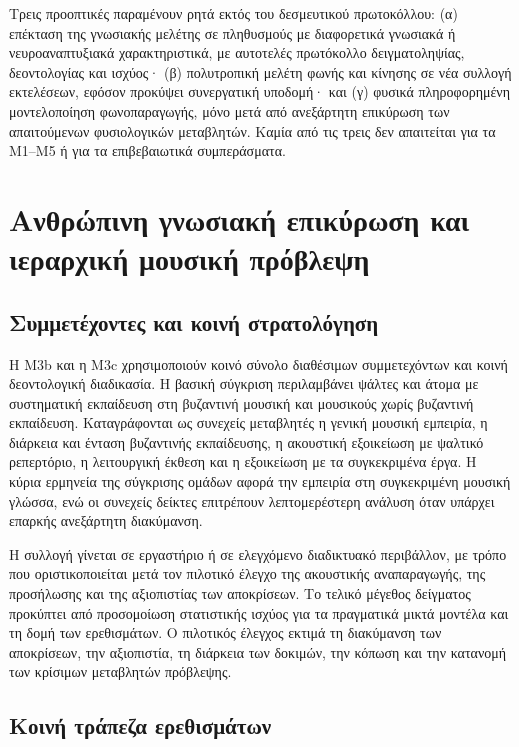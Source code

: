 \documentclass[11pt,a4paper]{article}
\begin{document}
Τρεις προοπτικές παραμένουν ρητά εκτός του δεσμευτικού πρωτοκόλλου: (α) επέκταση της γνωσιακής μελέτης σε πληθυσμούς με διαφορετικά γνωσιακά ή νευροαναπτυξιακά χαρακτηριστικά, με αυτοτελές πρωτόκολλο δειγματοληψίας, δεοντολογίας και ισχύος· (β) πολυτροπική μελέτη φωνής και κίνησης σε νέα συλλογή εκτελέσεων, εφόσον προκύψει συνεργατική υποδομή· και (γ) φυσικά πληροφορημένη μοντελοποίηση φωνοπαραγωγής, μόνο μετά από ανεξάρτητη επικύρωση των απαιτούμενων φυσιολογικών μεταβλητών. Καμία από τις τρεις δεν απαιτείται για τα M1--M5 ή για τα επιβεβαιωτικά συμπεράσματα.


\section{Ανθρώπινη γνωσιακή επικύρωση και ιεραρχική μουσική πρόβλεψη}\label{app:human}

\subsection{Συμμετέχοντες και κοινή στρατολόγηση}\label{app:human-participants}

Η M3b και η M3c χρησιμοποιούν κοινό σύνολο διαθέσιμων συμμετεχόντων και κοινή δεοντολογική διαδικασία. Η βασική σύγκριση περιλαμβάνει ψάλτες και άτομα με συστηματική εκπαίδευση στη βυζαντινή μουσική και μουσικούς χωρίς βυζαντινή εκπαίδευση. Καταγράφονται ως συνεχείς μεταβλητές η γενική μουσική εμπειρία, η διάρκεια και ένταση βυζαντινής εκπαίδευσης, η ακουστική εξοικείωση με ψαλτικό ρεπερτόριο, η λειτουργική έκθεση και η εξοικείωση με τα συγκεκριμένα έργα. Η κύρια ερμηνεία της σύγκρισης ομάδων αφορά την εμπειρία στη συγκεκριμένη μουσική γλώσσα, ενώ οι συνεχείς δείκτες επιτρέπουν λεπτομερέστερη ανάλυση όταν υπάρχει επαρκής ανεξάρτητη διακύμανση.

Η συλλογή γίνεται σε εργαστήριο ή σε ελεγχόμενο διαδικτυακό περιβάλλον, με τρόπο που οριστικοποιείται μετά τον πιλοτικό έλεγχο της ακουστικής αναπαραγωγής, της προσήλωσης και της αξιοπιστίας των αποκρίσεων. Το τελικό μέγεθος δείγματος προκύπτει από προσομοίωση στατιστικής ισχύος για τα πραγματικά μικτά μοντέλα και τη δομή των ερεθισμάτων. Ο πιλοτικός έλεγχος εκτιμά τη διακύμανση των αποκρίσεων, την αξιοπιστία, τη διάρκεια των δοκιμών, την κόπωση και την κατανομή των κρίσιμων μεταβλητών πρόβλεψης.

\subsection{Κοινή τράπεζα ερεθισμάτων}\label{app:human-stimuli}
\end{document}
